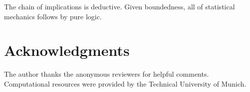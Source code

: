 \documentclass[twocolumn,10pt]{article}
\theoremstyle{definition}
\theoremstyle{remark}
\begin{document}
The chain of implications is deductive. Given boundedness, all of statistical mechanics follows by pure logic.

\section*{Acknowledgments}

The author thanks the anonymous reviewers for helpful comments. Computational resources were provided by the Technical University of Munich.




\end{document}
